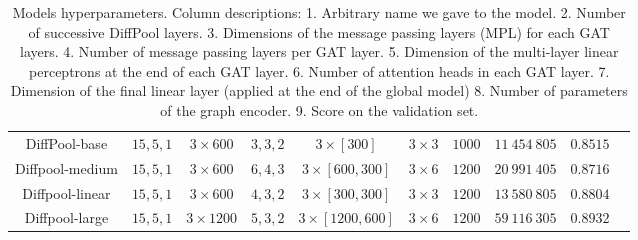 \documentclass[switch, 11pt]{article}
\begin{document}
\begin{table}
\begin{center}
{\begin{tabular}{|c|c|c|c|c|c|c|c|c|c|}
                DiffPool-base                    & $15, 5, 1 $                           & $3 \times 600$                      & $3, 3, 2$                 & $3 \times [300]$                                      & $3\times 3$                           & $1000$                                   & $11\:454\: 805$                        & $0.8515$                               \\
                Diffpool-medium                  & $15, 5, 1 $                           & $3 \times 600$                      & $6, 4, 3$                 & $3\times [600, 300]$                                  & $3\times 6$                           & $1200$                                   & $20\:991\:405$                         & $0.8716$                               \\
                Diffpool-linear                  & $15, 5, 1 $                           & $3 \times 600$                      & $4, 3, 2$                 & $3\times [300, 300]$                                  & $3\times 3$                           & $1200$                                   & $13\:580\:805$                         & $0.8804$                               \\
                Diffpool-large                   & $15, 5, 1 $                           & $3 \times 1200$                     & $5, 3, 2$                 & $3\times [1200, 600]$                                 & $3\times 6$                           & $1200$                                   & $59\:116\:305$                         & $0.8932$                               \\
                \midrule
            \end{tabular}
        }
    \end{center}
    \caption{Models hyperparameters. Column descriptions: 1. Arbitrary name we gave to the model. 2. Number of successive DiffPool layers. 3. Dimensions of the message passing layers (MPL) for each GAT layers. 4. Number of message passing layers per GAT layer. 5. Dimension of the multi-layer linear perceptrons at the end of each GAT layer. 6. Number of attention heads in each GAT layer. 7. Dimension of the final linear layer (applied at the end of the global model) 8. Number of parameters of the graph encoder. 9. Score on the validation set.}

    \label{tab:models}
\end{table}
\end{document}
